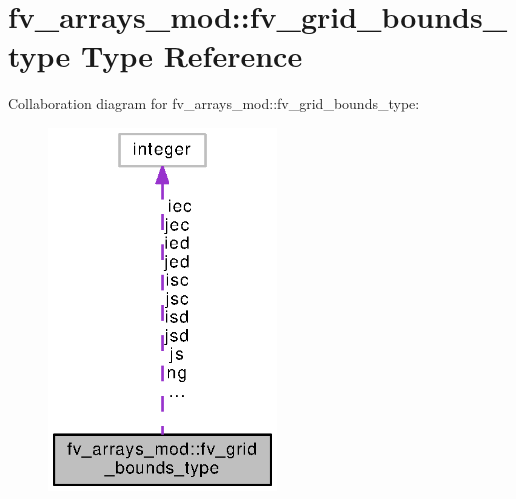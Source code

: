 \section{fv\-\_\-arrays\-\_\-mod\-:\-:fv\-\_\-grid\-\_\-bounds\-\_\-type Type Reference}
\label{structfv__arrays__mod_1_1fv__grid__bounds__type}


Collaboration diagram for fv\-\_\-arrays\-\_\-mod\-:\-:fv\-\_\-grid\-\_\-bounds\-\_\-type\-:
\nopagebreak
\begin{figure}[H]
\begin{center}
\leavevmode
\includegraphics[width=172pt]{structfv__arrays__mod_1_1fv__grid__bounds__type__coll__graph}
\end{center}
\end{figure}

